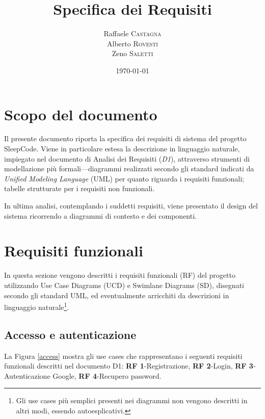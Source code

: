 \documentclass[11pt, a4paper]{article}
\title{Specifica dei Requisiti}
\author{Raffaele \textsc{Castagna}\\
Alberto \textsc{Rovesti}\\
Zeno \textsc{Saletti}}
\date{\today}
\theoremstyle{definition} %
\begin{document}


\tableofcontents

\afterpage{\cfoot{\thepage}}
\newpage
\section*{Scopo del documento}
Il presente documento riporta la specifica dei requisiti di sistema
del progetto SleepCode. Viene in particolare estesa la descrizione
in linguaggio naturale, impiegato nel documento di Analisi dei Requisiti
(\textit{D1}), attraverso strumenti di modellazione più formali—diagrammi
realizzati secondo gli standard indicati da \textit{Unified Modeling Language}
(UML) per quanto riguarda i requisiti funzionali; tabelle strutturate
per i requisiti non funzionali.

In ultima analisi, contemplando i suddetti requisiti, viene presentato il
design del sistema ricorrendo a diagrammi di contesto e dei componenti.


\newpage
\section{Requisiti funzionali}
In questa sezione vengono descritti i requisiti funzionali (RF) del
progetto utilizzando Use Case Diagrams (UCD) e Swimlane Diagrams (SD),
disegnati secondo gli standard UML, ed eventualmente arricchiti da
descrizioni in linguaggio naturale\footnote{Gli use cases più semplici
presenti nei diagrammi non vengono descritti in altri modi, essendo
autoesplicativi.}.

\subsection{Accesso e autenticazione}
La Figura \ref{access} mostra gli use cases che rappresentano i seguenti
requisiti funzionali descritti nel documento D1: \textbf{RF 1}-Registrazione,
\textbf{RF 2}-Login, \textbf{RF 3}-Autenticazione Google, \textbf{RF 4}-Recupero
password.
\end{document}
